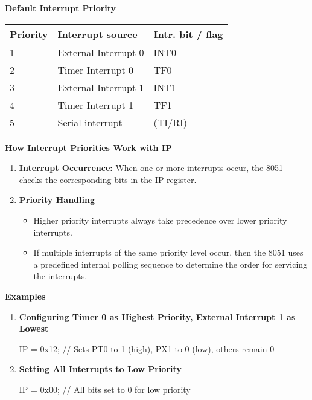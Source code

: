 \documentclass[
]{article}
\newenvironment{Shaded}{}{}
\newcommand{\NormalTok}[1]{#1}
\begin{document}
\textbf{Default Interrupt Priority}

\begin{longtable}[]{@{}lll@{}}
\toprule
\textbf{Priority} & \textbf{Interrupt source} & \textbf{Intr. bit /
flag} \\
\midrule
\endhead
1 & External Interrupt 0 & INT0 \\
2 & Timer Interrupt 0 & TF0 \\
3 & External Interrupt 1 & INT1 \\
4 & Timer Interrupt 1 & TF1 \\
5 & Serial interrupt & (TI/RI) \\
\bottomrule
\end{longtable}

\textbf{How Interrupt Priorities Work with IP}

\begin{enumerate}
\def\labelenumi{\arabic{enumi}.}
\item
  \textbf{Interrupt Occurrence:} When one or more interrupts occur, the
  8051 checks the corresponding bits in the IP register.
\item
  \textbf{Priority Handling}

  \begin{itemize}
  \item
    Higher priority interrupts always take precedence over lower
    priority interrupts.
  \item
    If multiple interrupts of the same priority level occur, then the
    8051 uses a predefined internal polling sequence to determine the
    order for servicing the interrupts.
  \end{itemize}
\end{enumerate}

\textbf{Examples}

\begin{enumerate}
\def\labelenumi{\arabic{enumi}.}
\item
  \textbf{Configuring Timer 0 as Highest Priority, External Interrupt 1
  as Lowest}

\begin{Shaded}
\begin{Highlighting}[]
\NormalTok{IP = 0x12; // Sets PT0 to \textquotesingle{}1\textquotesingle{} (high), PX1 to \textquotesingle{}0\textquotesingle{} (low), others remain \textquotesingle{}0\textquotesingle{}}
\end{Highlighting}
\end{Shaded}
\item
  \textbf{Setting All Interrupts to Low Priority}

\begin{Shaded}
\begin{Highlighting}[]
\NormalTok{IP = 0x00; // All bits set to \textquotesingle{}0\textquotesingle{} for low priority}
\end{Highlighting}
\end{Shaded}
\end{enumerate}
\end{document}
